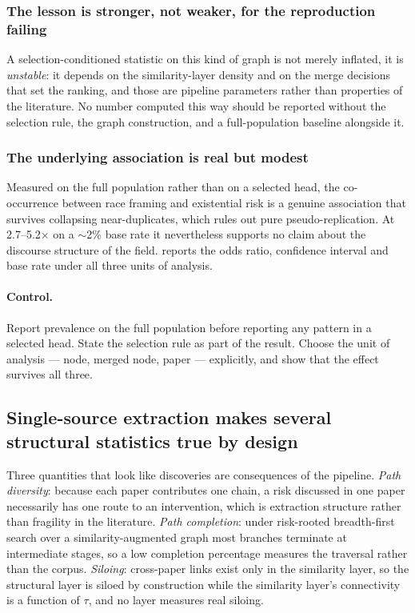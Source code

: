 \documentclass[10pt,twocolumn,letterpaper]{article}
\begin{document}
\subsubsection{The lesson is stronger, not weaker, for the reproduction failing}

A selection-conditioned statistic on this kind of graph is not merely inflated, it is
\emph{unstable}: it depends on the similarity-layer density and on the merge decisions
that set the ranking, and those are pipeline parameters rather than properties of the
literature. No number computed this way should be reported without the selection rule,
the graph construction, and a full-population baseline alongside it.

\subsubsection{The underlying association is real but modest}

Measured on the full population rather than on a selected head, the co-occurrence between
race framing and existential risk is a genuine association that survives collapsing
near-duplicates, which rules out pure pseudo-replication. At 2.7--5.2$\times$ on a
$\sim$2\% base rate it nevertheless supports no claim about the discourse structure of
the field.  reports the odds ratio, confidence interval and base rate
under all three units of analysis.

\paragraph{Control.} Report prevalence on the full population before reporting any
pattern in a selected head. State the selection rule as part of the result. Choose the
unit of analysis --- node, merged node, paper --- explicitly, and show that the effect
survives all three.

\subsection{Single-source extraction makes several structural statistics true by design}
\label{sec:r-bydesign}

Three quantities that look like discoveries are consequences of the pipeline.
\emph{Path diversity}: because each paper contributes one chain, a risk discussed in one
paper necessarily has one route to an intervention, which is extraction structure rather
than fragility in the literature. \emph{Path completion}: under risk-rooted
breadth-first search over a similarity-augmented graph most branches terminate at
intermediate stages, so a low completion percentage measures the traversal rather than
the corpus. \emph{Siloing}: cross-paper links exist only in the similarity layer, so the
structural layer is siloed by construction while the similarity layer's connectivity is a
function of $\tau$, and no layer measures real siloing.
\end{document}

